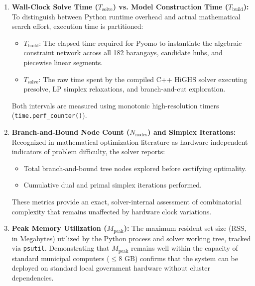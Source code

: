 \begin{enumerate}
    \item \textbf{Wall-Clock Solve Time ($T_{\text{solve}}$) vs. Model Construction Time ($T_{\text{build}}$):}
    To distinguish between Python runtime overhead and actual mathematical search effort, execution time is partitioned:
    \begin{itemize}
        \item $T_{\text{build}}$: The elapsed time required for Pyomo to instantiate the algebraic constraint network across all 182 barangays, candidate hubs, and piecewise linear segments.
        \item $T_{\text{solve}}$: The raw time spent by the compiled C++ HiGHS solver executing presolve, LP simplex relaxations, and branch-and-cut exploration.
    \end{itemize}
    Both intervals are measured using monotonic high-resolution timers (\texttt{time.perf\_counter()}).
    
    \item \textbf{Branch-and-Bound Node Count ($N_{\text{nodes}}$) and Simplex Iterations:}
    Recognized in mathematical optimization literature as hardware-independent indicators of problem difficulty, the solver reports:
    \begin{itemize}
        \item Total branch-and-bound tree nodes explored before certifying optimality.
        \item Cumulative dual and primal simplex iterations performed.
    \end{itemize}
    These metrics provide an exact, solver-internal assessment of combinatorial complexity that remains unaffected by hardware clock variations.
    
    \item \textbf{Peak Memory Utilization ($M_{\text{peak}}$):}
    The maximum resident set size (RSS, in Megabytes) utilized by the Python process and solver working tree, tracked via \texttt{psutil}. Demonstrating that $M_{\text{peak}}$ remains well within the capacity of standard municipal computers ($\le 8\text{ GB}$) confirms that the system can be deployed on standard local government hardware without cluster dependencies.
\end{enumerate}

